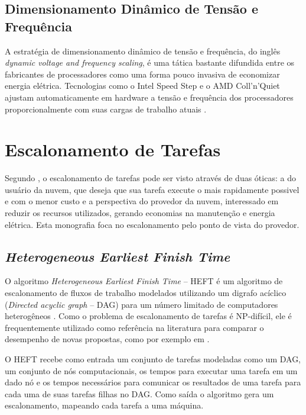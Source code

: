 \subsection{Dimensionamento Dinâmico de Tensão e Frequência}
\label{subsec:dvfs}
A estratégia de dimensionamento dinâmico de tensão e frequência, do inglês 
\emph{dynamic voltage and frequency scaling}, é uma tática 
bastante difundida entre os fabricantes de processadores como uma forma pouco
invasiva de economizar energia elétrica. Tecnologias como o Intel Speed Step
e o AMD Coll'n'Quiet ajustam automaticamente em hardware a tensão
e frequência dos processadores proporcionalmente com suas cargas de trabalho
atuais \cite{lago:escalonamento_com_prioridade_eficiente}.


\section{Escalonamento de Tarefas}
\label{sec:escalonamento_tarefas}
Segundo \cite{lago:escalonamento_com_prioridade_eficiente}, o escalonamento de 
tarefas pode ser visto através de duas óticas: a do usuário da nuvem, que deseja
que sua tarefa execute o mais rapidamente possivel e com o menor custo e a 
perspectiva do provedor da nuvem, interessado em reduzir os recursos utilizados,
gerando economias na manutenção e energia elétrica. Esta monografia foca no
escalonamento pelo ponto de vista do provedor. 


\subsection{\emph{Heterogeneous Earliest Finish Time}}
\label{subsec:heft}
O algoritmo \emph{Heterogeneous Earliest Finish Time} -- HEFT é um algoritmo de
escalonamento de fluxos de trabalho modelados utilizando um digrafo acíclico
(\emph{Directed acyclic graph} -- DAG) para um número limitado de computadores
heterogêneos \cite{kim:virtual_computing}. Como o problema de escalonamento de
tarefas é NP-difícil, ele é frequentemente utilizado como
referência na literatura para comparar o desempenho de novas propostas, 
como por exemplo em \cite{batista:embedding_software_requirements}.

O HEFT recebe como entrada um 
conjunto de tarefas modeladas como um DAG, um conjunto de nós computacionais,
os tempos para executar uma tarefa em um dado nó e os tempos necessários para
comunicar os resultados de uma tarefa para cada uma de suas tarefas filhas no
DAG. Como saída o algoritmo gera um escalonamento, mapeando cada tarefa a uma
máquina.

